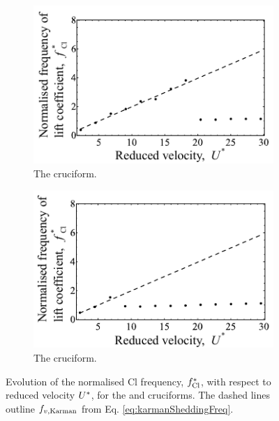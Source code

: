 \documentclass[oneside]{utmthesis}
\begin{document}
\begin{figure}
  \centering
  \begin{subfigure}[h]{0.4\textwidth}
    \includegraphics[width=\textwidth]{figs/clFreq2}
    \caption{The \angtw{} cruciform.}
    \label{fig:clFreq2}
  \end{subfigure}
  \hspace{6mm}
  \begin{subfigure}[h]{0.4\textwidth}
    \includegraphics[width=\textwidth]{figs/clFreq1}
    \caption{The \angon{} cruciform.}
    \label{fig:clFreq1}
  \end{subfigure}

  \label{fig:clFreq21}
  \caption{Evolution of the normalised Cl frequency, $f_{\text{Cl}}^{*}$, with respect to reduced velocity $U^{*}$, for the \angtw{} and \angon{} cruciforms. The dashed lines outline $f_{v,\text{Karman}}$ from Eq. \ref{eq:karmanSheddingFreq}.}
\end{figure}
\end{document}
